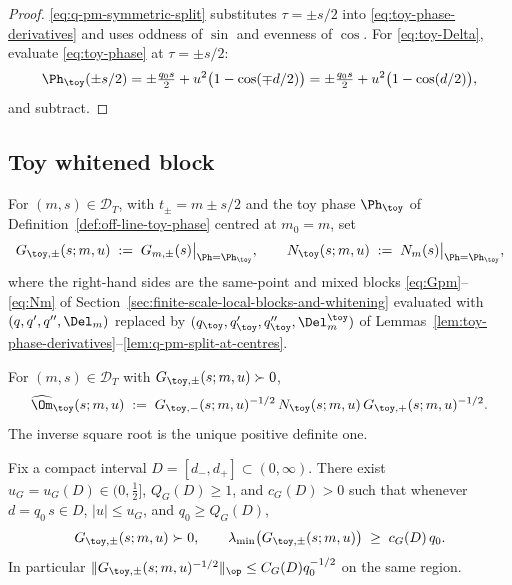 \begin{proof}
\eqref{eq:q-pm-symmetric-split} substitutes \(\tau=\pm s/2\) into
\eqref{eq:toy-phase-derivatives} and uses oddness of \(\sin\) and
evenness of \(\cos\).  For \eqref{eq:toy-Delta}, evaluate
\eqref{eq:toy-phase} at \(\tau=\pm s/2\):
\[
\Ph_\toy(\pm s/2)
=\pm\tfrac{q_0 s}{2}
+u^2\bigl(1-\cos(\mp d/2)\bigr)
=\pm\tfrac{q_0 s}{2}
+u^2\bigl(1-\cos(d/2)\bigr),
\]
and subtract.
\end{proof}

\subsection{Toy whitened block}
\label{subsec:toy-whitened-block}

\begin{definition}
\label{def:toy-finite-blocks}
For \((m,s)\in\mathcal D_T\), with \(t_\pm=m\pm s/2\) and the toy phase
\(\Ph_\toy\) of Definition~\ref{def:off-line-toy-phase} centred at
\(m_0=m\), set
\begin{equation}
\label{eq:toy-G-N}
G_{\toy,\pm}(s;m,u)\;:=\;G_{m,\pm}(s)\big|_{\Ph=\Ph_\toy},
\qquad
N_\toy(s;m,u)\;:=\;N_m(s)\big|_{\Ph=\Ph_\toy},
\end{equation}
where the right-hand sides are the same-point and mixed blocks
\eqref{eq:Gpm}--\eqref{eq:Nm} of
Section~\ref{sec:finite-scale-local-blocks-and-whitening} evaluated
with \((q,q',q'',\Del_m)\) replaced by
\((q_\toy,q_\toy',q_\toy'',\Del_m^\toy)\) of
Lemmas~\ref{lem:toy-phase-derivatives}--\ref{lem:q-pm-split-at-centres}.
\end{definition}

\begin{definition}
\label{def:toy-whitened-block}
For \((m,s)\in\mathcal D_T\) with \(G_{\toy,\pm}(s;m,u)\succ 0\),
\begin{equation}
\label{eq:omega-toy}
\widehat\Om_\toy(s;m,u)
\;:=\;G_{\toy,-}(s;m,u)^{-1/2}\,N_\toy(s;m,u)\,G_{\toy,+}(s;m,u)^{-1/2}.
\end{equation}
The inverse square root is the unique positive definite one.
\end{definition}

\begin{lemma}
\label{lem:toy-block-positivity}
Fix a compact interval \(D=[d_-,d_+]\subset(0,\infty)\).  There exist
\(u_G=u_G(D)\in(0,\tfrac12]\), \(Q_G(D)\ge1\), and \(c_G(D)>0\) such
that whenever \(d=q_0\,s\in D\), \(|u|\le u_G\), and \(q_0\ge Q_G(D)\),
\[
        G_{\toy,\pm}(s;m,u)\succ 0,
        \qquad
        \lambda_{\min}\bigl(G_{\toy,\pm}(s;m,u)\bigr)\;\ge\;c_G(D)\,q_0.
\]
In particular \(\|G_{\toy,\pm}(s;m,u)^{-1/2}\|_{\op}\le C_G(D)q_0^{-1/2}\)
on the same region.
\end{lemma}

